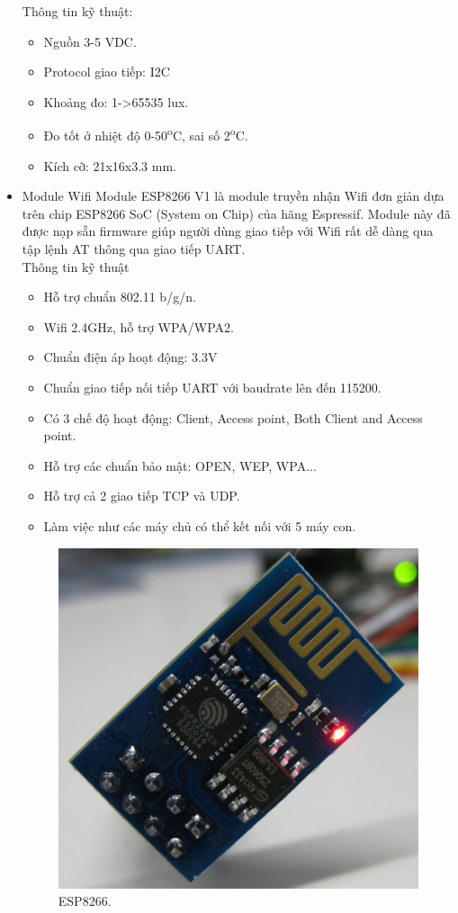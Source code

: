 \documentclass[a4paper,12pt,oneside]{article}
\begin{document}
\begin{itemize}
\noindent Thông tin kỹ thuật:
\begin{itemize}
\item Nguồn 3-5 VDC.
\item Protocol giao tiếp: I2C
\item Khoảng đo: 1->65535 lux.
\item Đo tốt ở nhiệt độ 0-50\textsuperscript{o}C, sai số 2\textsuperscript{o}C.
\item Kích cỡ: 21x16x3.3 mm.
\end{itemize}

\item Module Wifi
\noindent Module ESP8266 V1 là module truyền nhận Wifi đơn giản dựa trên chip ESP8266 SoC (System on Chip) của hãng Espressif. Module này đã được nạp sẵn firmware giúp người dùng giao tiếp với Wifi rất dễ dàng qua tập lệnh AT thông qua giao tiếp UART.\\
\noindent Thông tin kỹ thuật
\begin{itemize}
\item Hỗ trợ chuẩn 802.11 b/g/n.
\item Wifi 2.4GHz, hỗ trợ WPA/WPA2.
\item Chuẩn điện áp hoạt động: 3.3V
\item Chuẩn giao tiếp nối tiếp UART với baudrate lên đến 115200.
\item Có 3 chế độ hoạt động: Client, Access point, Both Client and Access point.
\item Hỗ trợ các chuẩn bảo mật: OPEN, WEP, WPA...
\item Hỗ trợ cả 2 giao tiếp TCP và UDP.
\item Làm việc như các máy chủ có thể kết nối với 5 máy con.
\end{itemize}

\begin{center}
\begin{figure}[htp]
\begin{center}
\includegraphics[scale=.4]{hinh/ESP8266.png}
\end{center}
\caption{ESP8266.}


\end{figure}
\end{center}
\end{itemize}
\end{document}
